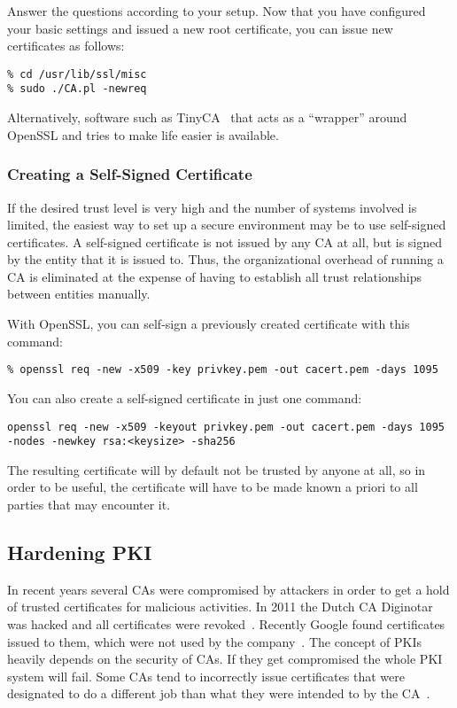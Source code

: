 Answer the questions according to your setup. Now that you have configured your basic settings and 
issued a new root certificate, you can issue new certificates as follows:

\begin{lstlisting}
% cd /usr/lib/ssl/misc
% sudo ./CA.pl -newreq
\end{lstlisting}

Alternatively, software such as TinyCA~\cite{Wikipedia:TinyCA} that
acts as a ``wrapper'' around OpenSSL and tries to make life easier is
available.

\subsubsection{Creating a Self-Signed Certificate}
\label{sec:pki:selfsignedcert}
If the desired trust level is very high and the number of systems involved
is limited, the easiest way to set up a secure environment may be to use
self-signed certificates.  A self-signed certificate is not issued by any
CA at all, but is signed by the entity that it is issued to.  Thus, the
organizational overhead of running a CA is eliminated at the expense of
having to establish all trust relationships between entities manually.

With OpenSSL, you can self-sign a previously created certificate with this command:

\begin{lstlisting}
% openssl req -new -x509 -key privkey.pem -out cacert.pem -days 1095
\end{lstlisting}

You can also create a self-signed certificate in just one command:
\begin{lstlisting}
openssl req -new -x509 -keyout privkey.pem -out cacert.pem -days 1095 -nodes -newkey rsa:<keysize> -sha256
\end{lstlisting}

The resulting certificate will by default not be trusted by anyone at all,
so in order to be useful, the certificate will have to be made known a
priori to all parties that may encounter it.


\subsection{Hardening PKI}
\label{sec:hardeningpki}

In recent years several CAs were compromised by attackers in order to get a
hold of trusted certificates for malicious activities. In 2011 the Dutch CA
Diginotar was hacked and all certificates were revoked~\cite{diginotar-hack}.
Recently Google found certificates issued to them, which were not used by the
company~\cite{googlecahack}. The concept of PKIs heavily depends on the
security of CAs.  If they get compromised the whole PKI system will fail. Some
CAs tend to incorrectly issue certificates that were designated to do a
different job than what they were intended to by the CA~\cite{gocode}.

